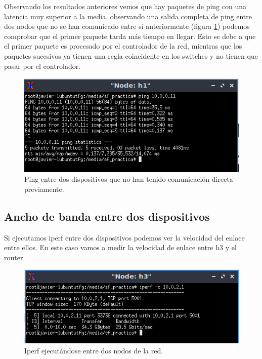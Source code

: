 Observando los resultados anteriores vemos que hay paquetes de ping con una latencia muy superior a la media. observando una salida completa de ping entre dos nodos que no se han comunicado entre sí anteriormente (figura \ref{fig:ping-first}) podemos comprobar que el primer paquete tarda más tiempo en llegar. Esto se debe a que el primer paquete es procesado por el controlador de la red, mientras que los paquetes sucesivos ya tienen una regla coincidente en los switches y no tienen que pasar por el controlador.

\begin{figure}[!h]
    \centering
    \includegraphics[width=\textwidth]{imagenes/figuras/ping_first.png}
    \caption{Ping entre dos dispositivos que no han tenido comunicación directa previamente.}
    \label{fig:ping-first}
\end{figure}

\subsection{Ancho de banda entre dos dispositivos}

Si ejecutamos iperf entre dos dispositivos podemos ver la velocidad del enlace entre ellos. En este caso vamos a medir la velocidad de enlace entre h3 y el router.

\begin{figure}[!h]
    \centering
    \includegraphics[width=\textwidth]{imagenes/figuras/iperf.png}
    \caption{Iperf ejecutándose entre dos nodos de la red.}
    \label{fig:iperf}
\end{figure}


